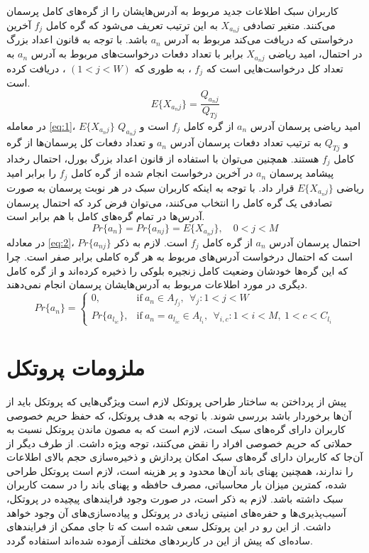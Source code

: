 کاربران سبک اطلاعات جدید مربوط به آدرس‌هایشان را از گره‌های کامل پرسمان می‌کنند. متغیر تصادفی $X_{{a_n}j}$ به این ترتیب تعریف می‌شود که گره کامل $f_j$ آخرین درخواستی که دریافت می‌کند مربوط به آدرس $a_n$ باشد. با توجه به قانون اعداد بزرگ در احتمال، امید ریاضی $X_{{a_n}j}$‌ برابر با تعداد  دفعات درخواست‌های مربوط به آدرس $a_n$ به تعداد کل درخواست‌هایی است که 
$f_j$
، به طوری که
$(1<j<W)$
، دریافت کرده است.
\begin{equation}
E\{X_{{a_n}j}\} = \frac{Q_{{a_n}j}}{Q_{Tj}} \label{eq:1}
\end{equation}
در معامله \eqref{eq:1}،
$E\{X_{{a_n}j}\}$
امید ریاضی پرسمان آدرس $a_n$ از گره کامل
$f_j$ 
است و
$Q_{{a_n}j}$
و
$Q_{Tj}$
به ترتیب تعداد دفعات پرسمان آدرس $a_n$ و تعداد دفعات کل پرسمان‌ها از گره کامل $f_j$ هستند. همچنین می‌توان با استفاده از قانون اعداد بزرگ بورل، احتمال رخداد پیشامد پرسمان $a_n$ در آخرین درخواست انجام شده از گره کامل $f_j$ را برابر امید ریاضی
$E\{X_{{a_n}j}\}$
قرار داد. با توجه به اینکه کاربران سبک در هر نوبت پرسمان به صورت تصادفی یک گره کامل را انتخاب می‌کنند، می‌توان فرض کرد که احتمال پرسمان آدرس‌ها در تمام گره‌های کامل با هم برابر است.
\begin{equation}
Pr\{a_{n}\} = Pr\{a_{nj}\} = E\{X_{{a_n}j}\},\quad 0<j<M \label{eq:2}
\end{equation}
در معادله \eqref{eq:2}، 
$Pr\{a_{nj}\}$
احتمال پرسمان آدرس $a_n$ از گره کامل
$f_j$ 
است. لازم به ذکر است که احتمال درخواست آدرس‌های مربوط به هر گره‌ کاملی برابر صفر است. چرا که این گره‌ها خودشان وضعیت کامل زنجیره بلوکی را ذخیره کرده‌اند و از گره کامل دیگری در مورد اطلاعات مربوط به آدرس‌هایشان پرسمان انجام نمی‌دهند.
\begin{equation}
Pr\{{a_n}\} = 
\begin{cases}
0, & \text{if}\ a_n \in A_{f_j},\ \ \forall_{j} : 1<j<W \\
Pr\{{a_{l_{ic}}}\}, & \text{if}\ a_n = a_{l_{ic}} \in A_{l_i},\ \ \forall_{i,c} : 1<i<M,\  1<c<C_{l_i}
\end{cases} \label{eq:3}
\end{equation} 

\section{ملزومات پروتکل}
\label{subsubsection:4.2}
پیش از پرداختن به ساختار طراحی پروتکل لازم است ویژگی‌هایی که پروتکل باید از آن‌ها برخوردار باشد بررسی شوند. با توجه به هدف پروتکل، که حفظ حریم خصوصی کاربران دارای گره‌های سبک است، لازم است که به مصون ماندن پروتکل نسبت به حملاتی که حریم خصوصی افراد را نقض می‌کنند، توجه ویژه داشت. از طرف دیگر از آن‌جا که کاربران دارای گره‌های سبک امکان پردازش‌ و ذخیره‌سازی حجم بالای اطلاعات را ندارند، همچنین پهنای باند آن‌ها محدود و پر هزینه است، لازم است پروتکل طراحی شده، کمترین میزان بار محاسباتی،‌ مصرف حافظه و پهنای باند را در سمت کاربران سبک داشته باشد. لازم به ذکر است، در صورت وجود فرایند‌های پیچیده در پروتکل، آسیب‌پذیری‌ها و حفره‌های امنیتی زیادی در پروتکل و پیاده‌سازی‌های آن وجود خواهد داشت. از این رو در این پروتکل سعی شده است که تا جای ممکن از فرایند‌های ساده‌ای که پیش از این در کاربرد‌های مختلف آزموده شده‌اند استفاده گردد.

